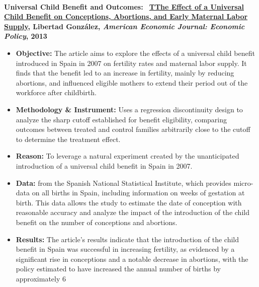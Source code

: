\textbf{Universal Child Benefit and Outcomes: \footnotesize \textsuperscript\ \href{Gonzlez-EffectUniversalChild-2013.pdf}{TThe Effect of a Universal Child Benefit on Conceptions, Abortions, and Early Maternal Labor Supply}, Libertad González, \textit{American Economic Journal: Economic Policy}, 2013}

\begin{itemize}
    \scriptsize

\item \textbf{Objective:} The article aims to explore the effects of a universal child benefit introduced in Spain in 2007 on fertility rates and maternal labor supply. It finds that the benefit led to an increase in fertility, mainly by reducing abortions, and influenced eligible mothers to extend their period out of the workforce after childbirth​​.

\item \textbf{Methodology \& Instrument:} Uses a regression discontinuity design to analyze the sharp cutoff established for benefit eligibility, comparing outcomes between treated and control families arbitrarily close to the cutoff to determine the treatment effect​​.

\item \textbf{Reason:} To leverage a natural experiment created by the unanticipated introduction of a universal child benefit in Spain in 2007. 

\item \textbf{Data:}  from the Spanish National Statistical Institute, which provides micro-data on all births in Spain, including information on weeks of gestation at birth. This data allows the study to estimate the date of conception with reasonable accuracy and analyze the impact of the introduction of the child benefit on the number of conceptions and abortions​​.

\item \textbf{Results:} The article's results indicate that the introduction of the child benefit in Spain was successful in increasing fertility, as evidenced by a significant rise in conceptions and a notable decrease in abortions, with the policy estimated to have increased the annual number of births by approximately 6%

\end{itemize}
